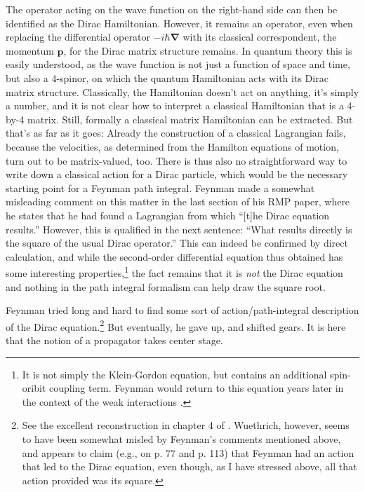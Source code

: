 \documentclass[12pt]{article}
\begin{document}
The operator acting on the wave function on the right-hand side can then be identified as the Dirac Hamiltonian. However, it remains an operator, even when replacing the differential operator $-i\hbar \mathbf{\nabla}$ with its classical correspondent, the momentum $\mathbf{p}$, for the Dirac matrix structure remains. In quantum theory this is easily understood, as the wave function is not just a function of space and time, but also a 4-spinor, on which the quantum Hamiltonian acts with its Dirac matrix structure. Classically, the Hamiltonian doesn't act on anything, it's simply a number, and it is not clear how to interpret a classical Hamiltonian that is a 4-by-4 matrix. Still, formally a classical matrix Hamiltonian can be extracted. But that's as far as it goes: Already the construction of a classical Lagrangian fails, because the velocities, as determined from the Hamilton equations of motion, turn out to be matrix-valued, too. There is thus also no straightforward way to write down a classical action for a Dirac particle, which would be the necessary starting point for a Feynman path integral. Feynman made a somewhat misleading comment on this matter in the last section of his RMP paper, where he states that he had found a Lagrangian from which ``[t]he Dirac equation results.'' However, this is qualified in the next sentence: ``What results directly is the square of the usual Dirac operator.'' This can indeed be confirmed by direct calculation, and while the second-order differential equation thus obtained has some interesting properties,\footnote{It is not simply the Klein-Gordon equation, but contains an additional spin-oribit coupling term. Feynman would return to this equation years later in the context of the weak interactions \citep{feynman_1958_theory}.} the fact remains that it is \emph{not} the Dirac equation and nothing in the path integral formalism can help draw the square root.

Feynman tried long and hard to find some sort of action/path-integral description of the Dirac equation.\footnote{\label{fn:misled} See the excellent reconstruction in chapter 4 of \citep{wuethrich_2010_the-genesis}. Wuethrich, however, seems to have been somewhat misled by Feynman's comments mentioned above, and appears to claim (e.g., on p. 77 and p. 113) that Feynman had an action that led to the Dirac equation, even though, as I have stressed above, all that action provided was its square.} But eventually, he gave up, and shifted gears. It is here that the notion of a propagator takes center stage.
\end{document}
